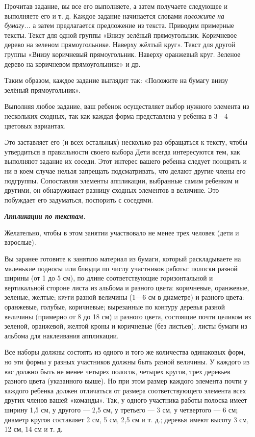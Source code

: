 \documentclass[a5paper]{book}
\renewcommand{\emph}[1]{\textit{#1}}
\begin{document}
Прочитав задание, вы все его выполняете, а затем получаете следующее и
выполняете его и т. д. Каждое задание начинается словами \emph{положите
на бумагу...} а затем предлагается предложение из текста. Приводим
примерные тексты. Текст для одной группы «Внизу зелёный прямоугольник.
Коричневое дерево на зеленом прямоугольнике. Наверху жёлтый круг». Текст
для другой группы «Внизу коричневый прямоугольник. Наверху оранжевый
круг. Зеленое дерево на коричневом прямоугольнике» и др.

Таким образом, каждое задание выглядит так: «Положите на бумагу внизу
зелёный прямоугольник».

Выполняя любое задание, ваш ребенок осуществляет выбор нужного элемента
из нескольких сходных, так как каждая форма представлена у ребенка в
3---4 цветовых вариантах.

Это заставляет его (и всех остальных) несколько раз обращаться к тексту,
чтобы утвердиться в правильности своего выбора Дети всегда интересуются
тем, как выполняют задание их соседи. Этот интерес вашего ребенка
следует \textsc{поощ}рять и ни в коем случае нельзя запрещать
подсматривать, что делают другие члены его подгруппы. Сопоставляя
элементы аппликации, выбранные самим ребенком и другими, он обнаруживает
разницу сходных элементов в величине. Это побуждает его задуматься,
поспорить с соседями.

\emph{\textbf{Аппликации по текстам.}}

Желательно, чтобы в этом занятии участвовало не менее трех человек (дети
и взрослые).

Вы заранее готовите к занятию материал из бумаги, который раскладываете
на маленькие подносы или блюдца по числу участников работы: полоски
разной ширины (от 1 до 5 см), по длине соответствующие горизонтальной и
вертикальной стороне листа из альбома и разного цвета: коричневые,
оранжевые, зеленые, желтые; \textsc{круги} разной величины (1---6 см в
диаметре) и разного цвета: оранжевые, голубые, коричневые; вырезанные по
контуру деревья разной величины (примерно от 8 до 18 см) и разного
цвета, состоящие почти целиком из зеленой, оранжевой, желтой кроны и
коричневые (без листьев); листы бумаги из альбома для наклеивания
аппликации.

Все наборы должны состоять из одного и того же количества одинаковых
форм, но эти формы у разных участников должны быть разной величины. У
каждого из вас должно быть не менее четырех полосок, четырех кругов,
трех деревьев разного цвета (указанного выше). Но при этом размер
каждого элемента почти у каждого ребенка должен отличаться от размера
соответствующего элемента всех других членов вашей «команды». Так, у
одного участника работы полоска имеет ширину 1,5 см, у другого --- 2,5
см, у третьего --- 3 см, у четвертого --- 6 см; диаметр кругов
составляет 2 см, 5 см, 2,5 см и т. д.; деревья имеют высоту 3 см, 12 см,
14 см и т. д.
\end{document}
